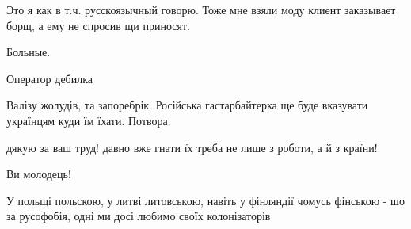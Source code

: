 \begin{itemize}
\begin{itemize}
Это я как в т.ч. русскоязычный говорю. Тоже мне взяли моду клиент заказывает
борщ, а ему не спросив щи приносят.

Больные.

\end{itemize}

 
Оператор дебилка

 
Валізу жолудів, та запоребрік. Російська гастарбайтерка ще буде вказувати українцям куди їм їхати. Потвора.

 
дякую за ваш труд! давно вже гнати їх треба не лише з роботи, а й з країни!

 
Ви молодець!

 
У польщі польскою, у литві литовською, навіть у фінляндії чомусь фінською - шо за русофобія, одні ми досі любимо своїх колонізаторів

\end{itemize}

